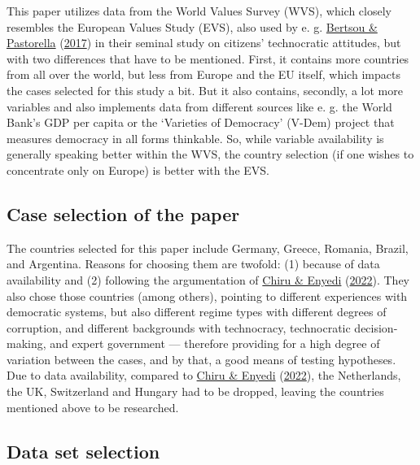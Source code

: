 \documentclass[
  12pt,
  english,
]{article}
\begin{document}
This paper utilizes data from the World Values Survey (WVS), which
closely resembles the European Values Study (EVS), also used by e. g.
\protect\hyperlink{ref-bertsou2017technocratic}{Bertsou \& Pastorella}
(\protect\hyperlink{ref-bertsou2017technocratic}{2017}) in their seminal
study on citizens' technocratic attitudes, but with two differences that
have to be mentioned. First, it contains more countries from all over
the world, but less from Europe and the EU itself, which impacts the
cases selected for this study a bit. But it also contains, secondly, a
lot more variables and also implements data from different sources like
e. g. the World Bank's GDP per capita or the `Varieties of Democracy'
(V-Dem) project that measures democracy in all forms thinkable. So,
while variable availability is generally speaking better within the WVS,
the country selection (if one wishes to concentrate only on Europe) is
better with the EVS.

\hypertarget{case-selection-of-the-paper}{%
\subsection{Case selection of the
paper}\label{case-selection-of-the-paper}}

The countries selected for this paper include Germany, Greece, Romania,
Brazil, and Argentina. Reasons for choosing them are twofold: (1)
because of data availability and (2) following the argumentation of
\protect\hyperlink{ref-chiru2022wants}{Chiru \& Enyedi}
(\protect\hyperlink{ref-chiru2022wants}{2022}). They also chose those
countries (among others), pointing to different experiences with
democratic systems, but also different regime types with different
degrees of corruption, and different backgrounds with technocracy,
technocratic decision-making, and expert government --- therefore
providing for a high degree of variation between the cases, and by that,
a good means of testing hypotheses. Due to data availability, compared
to \protect\hyperlink{ref-chiru2022wants}{Chiru \& Enyedi}
(\protect\hyperlink{ref-chiru2022wants}{2022}), the Netherlands, the UK,
Switzerland and Hungary had to be dropped, leaving the countries
mentioned above to be researched.

\hypertarget{data-set-selection}{%
\subsection{Data set selection}\label{data-set-selection}}
\end{document}

